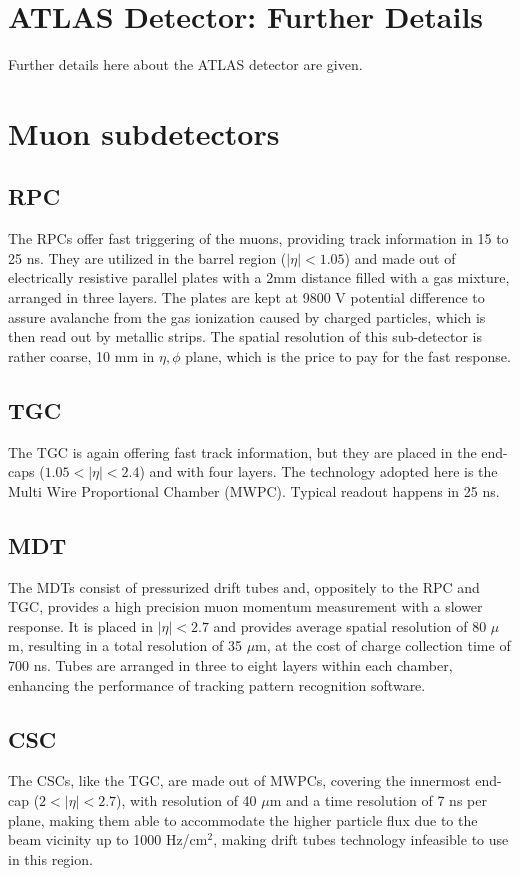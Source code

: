 \section{ATLAS Detector: Further Details}
Further details here about the ATLAS detector are given.
\section{Muon subdetectors}
\subsection{RPC}
The RPCs offer fast triggering of the muons, providing track information in 15 to 25 ns. They are utilized in the barrel region ($|\eta|<1.05$) and made out of electrically resistive parallel plates with a 2mm distance filled with a gas mixture, arranged in three layers. The plates are kept at 9800 V potential difference to assure avalanche from the gas ionization caused by charged particles, which is then read out by metallic strips. The spatial resolution of this sub-detector is rather coarse, 10 mm in $\eta,\phi$ plane, which is the price to pay for the fast response.  

\subsection{TGC}
The TGC is again offering fast track information, but they are placed in the end-caps ($1.05<|\eta|<2.4$) and with four layers. The technology adopted here is the Multi Wire Proportional Chamber (MWPC). Typical readout happens in 25 ns.

\subsection{MDT}
The MDTs consist of pressurized drift tubes and, oppositely to the RPC and TGC, provides a high precision muon momentum measurement with a slower response. It is placed in $|\eta|<2.7$ and provides average spatial resolution of 80 $\mu$m, resulting in a total resolution of 35 $\mu$m, at the cost of charge collection time of 700 ns.
Tubes are arranged in three to eight layers within each chamber, enhancing the performance of tracking pattern recognition software.

\subsection{CSC}
The CSCs, like the TGC, are made out of MWPCs, covering the innermost end-cap ($2<|\eta|<2.7$), with resolution of 40 $\mu$m and a time resolution of 7 ns per plane, making them able to accommodate the higher particle flux due to the beam vicinity up to 1000 Hz/cm$^2$, making drift tubes technology infeasible to use in this region.


